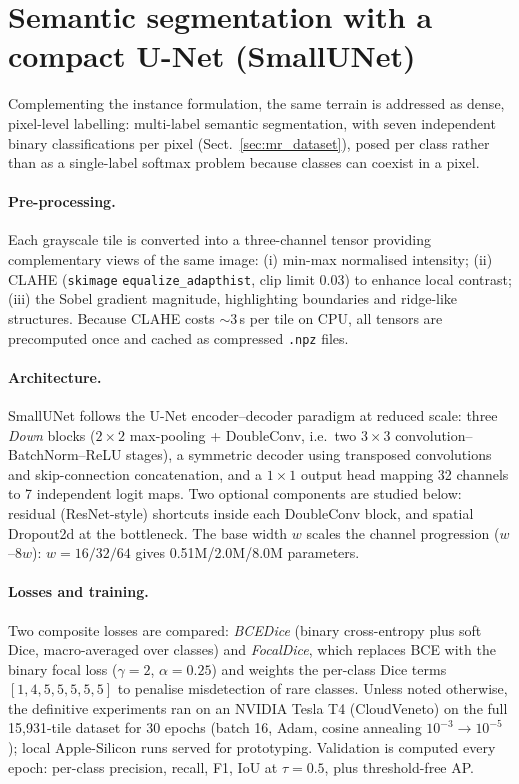 \documentclass{aa}
\begin{document}
\section{Semantic segmentation with a compact U-Net (SmallUNet)}
\label{sec:moon_recognition}

Complementing the instance formulation, the same terrain is addressed as dense, pixel-level labelling: multi-label semantic segmentation, with seven independent binary classifications per pixel (Sect.~\ref{sec:mr_dataset}), posed per class rather than as a single-label softmax problem because classes can coexist in a pixel.

\paragraph{Pre-processing.}
Each grayscale tile is converted into a three-channel tensor providing complementary views of the same image: (i) min-max normalised intensity; (ii) CLAHE (\texttt{skimage} \texttt{equalize\_adapthist}, clip limit 0.03) to enhance local contrast; (iii) the Sobel gradient magnitude, highlighting boundaries and ridge-like structures. Because CLAHE costs ${\sim}3$\,s per tile on CPU, all tensors are precomputed once and cached as compressed \texttt{.npz} files.

\paragraph{Architecture.}
SmallUNet follows the U-Net encoder--decoder paradigm \citep{ronneberger2015unet} at reduced scale: three \emph{Down} blocks ($2\times2$ max-pooling + DoubleConv, i.e.\ two $3\times3$ convolution--BatchNorm--ReLU stages), a symmetric decoder using transposed convolutions and skip-connection concatenation, and a $1\times1$ output head mapping 32 channels to 7 independent logit maps. Two optional components are studied below: residual (ResNet-style) shortcuts inside each DoubleConv block, and spatial Dropout2d at the bottleneck. The base width $w$ scales the channel progression ($w$--$8w$): $w=16/32/64$ gives 0.51M/2.0M/8.0M parameters.

\paragraph{Losses and training.}
Two composite losses are compared: \emph{BCEDice} (binary cross-entropy plus soft Dice, macro-averaged over classes) and \emph{FocalDice}, which replaces BCE with the binary focal loss \citep{lin2017focal} ($\gamma=2$, $\alpha=0.25$) and weights the per-class Dice terms $[1,4,5,5,5,5,5]$ to penalise misdetection of rare classes. Unless noted otherwise, the definitive experiments ran on an NVIDIA Tesla T4 (CloudVeneto) on the full 15{,}931-tile dataset for 30 epochs (batch 16, Adam, cosine annealing $10^{-3}\!\to\!10^{-5}$); local Apple-Silicon runs served for prototyping. Validation is computed every epoch: per-class precision, recall, F1, IoU at $\tau=0.5$, plus threshold-free AP.
\end{document}
